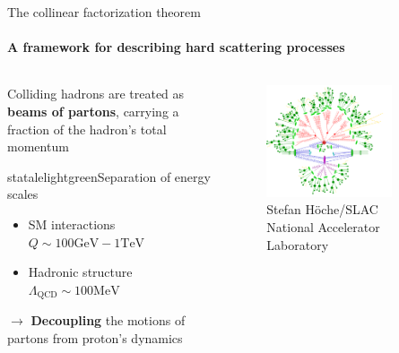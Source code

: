 
\begin{frame} {The collinear factorization theorem}
  \framesubtitle{A framework for describing hard scattering processes}
    
   \begin{columns}

    \begin{column}{0.6\textwidth}
    Colliding hadrons are treated as \textbf{beams of partons}, carrying a fraction of the hadron's total momentum
    
   \begin{colorblock}[black]{statalelightgreen}{Separation of energy scales}
        \begin{itemize}
          \item SM interactions $Q \sim 100 \text{GeV}-1\text{TeV}$
          \item Hadronic structure $\Lambda_{\mathrm{QCD}}\sim 100\text{MeV}$
        \end{itemize}
      \end{colorblock}
\begin{centering}
    $\to$ \textbf{Decoupling} the motions of partons from proton's dynamics
\end{centering}
    
    \end{column}

    \begin{column}{0.4\textwidth}
       \begin{figure}
        \centering
        \includegraphics[width=0.8\textwidth]{imgs/hadron-collision.png}
        \caption{Stefan Höche/SLAC National Accelerator Laboratory}
      \end{figure}
    

\end{column}
\end{columns}
\end{frame}
